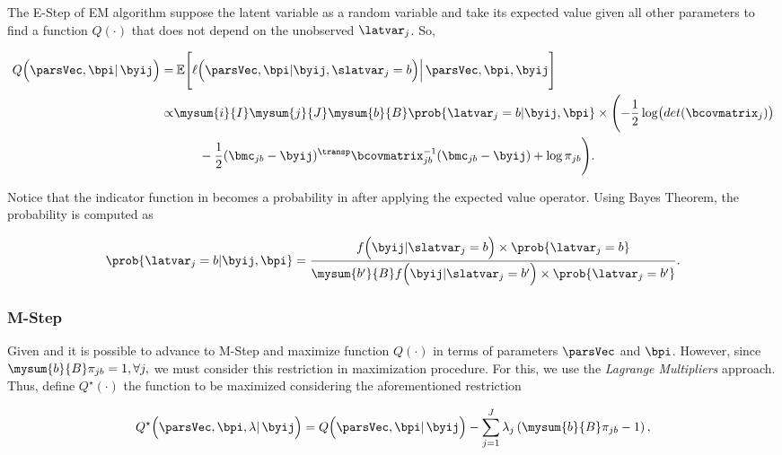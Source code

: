 The E-Step of EM algorithm suppose the latent variable as a random variable and take its expected value given all other parameters to find a function $Q(\cdot)$ that does not depend on the unobserved $\latvar_j$. So,

\begin{align}
  Q
  \Bigl(
  \parsVec, \bpi
  |\,
  \byij
  \Bigr)
  =&\:
     \mathbb{E}
     \Biggl[
     \ell
     \Bigl(
     \parsVec, \bpi
     |
     \byij,
     \slatvar_j=b
     \Bigr)
     \Big|
     \,
     \parsVec, \bpi, \byij
     \Biggr] \nonumber \\
  \propto
   &
     \mysum{i}{I}
     \mysum{j}{J}
     \mysum{b}{B}
    \prob{\latvar_j = b | \byij, \bpi} \times %
     \Biggl(
  -\frac{1}{2} \log \bigl(det(\bcovmatrix_j) \bigr) \nonumber \\
  &\qquad
          -\frac{1}{2}
     (\bmc_{jb} - \byij)^\transp
     \bcovmatrix_{jb}^{-1}
     (\bmc_{jb} - \byij)
     + \log \pi_{jb}
    \Biggr).
    \label{eq:qfunction}
\end{align}

Notice that the indicator function in  becomes a probability in  after applying the expected value operator. Using Bayes Theorem, the probability is computed as

\begin{equation}
  \label{eq:prob}
  \prob{\latvar_j = b | \byij, \bpi}
  =
  \frac
  {f\Bigl( \byij | \slatvar_j=b \Bigr) \times \prob{\latvar_j=b}}
  {\mysum{b^\prime}{B} f\Bigl( \byij | \slatvar_j=b^\prime \Bigr) \times \prob{\latvar_j=b^\prime}}.
\end{equation}


\subsubsection{M-Step}

Given  and  it is possible to advance to M-Step and maximize function $Q(\cdot)$ in terms of parameters $\parsVec$ and $\bpi$. However, since $\mysum{b}{B} \pi_{jb} = 1, \forall j,$ we must consider this restriction in maximization procedure. For this, we use the \textit{Lagrange Multipliers} approach. Thus, define $Q^\star(\cdot)$ the function to be maximized considering the aforementioned restriction

\begin{equation}
  \label{eq:mstep1}
  Q^\star
  \Bigl(
  \parsVec, \bpi, \lambda
  |\,
  \byij
  \Bigr)
  =
  Q
  \Bigl(
  \parsVec, \bpi
  |\,
  \byij
  \Bigr)
  -
  \sum_{j=1}^J
  \lambda_j
  \left(
    \mysum{b}{B} \pi_{jb} - 1
  \right),
\end{equation}

